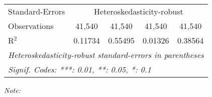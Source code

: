 \begin{table}[htbp!]
\begin{adjustbox}{width = 1\textwidth, max height = 0.95\textheight, center}
\begin{threeparttable}[b]
\begin{tabular}{lcccc}
            \midrule 
            Standard-Errors & \multicolumn{4}{c}{Heteroskedasticity-robust} \\ 
            Observations         & 41,540                          & 41,540                         & 41,540                         & 41,540\\  
            R$^2$                & 0.11734                         & 0.55495                        & 0.01326                        & 0.38564\\  
            \midrule \midrule
            \multicolumn{5}{l}{\emph{Heteroskedasticity-robust standard-errors in parentheses}}\\
            \multicolumn{5}{l}{\emph{Signif. Codes: ***: 0.01, **: 0.05, *: 0.1}}\\
         \end{tabular}
         
         \begin{tablenotes}\item \medskip \textit{Note:}
         \end{tablenotes}
      \end{threeparttable}
   \end{adjustbox}
\end{table}


